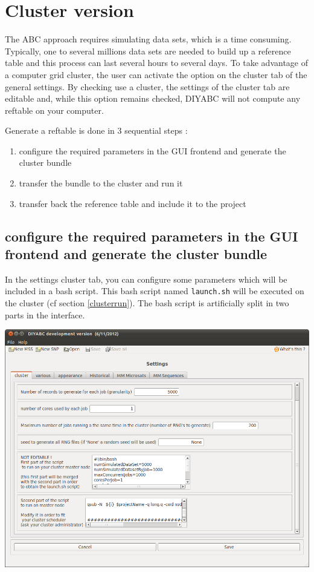 \clearpage
\section{Cluster version}\label{cluster}
The ABC approach requires simulating data sets, which is a time consuming. Typically, one to several millions data sets are needed to build up a reference table and this process can last several hours to several days. To take advantage of a computer grid cluster, the user can activate the option on the cluster tab of the general settings. By checking \textsf{use a cluster}, the settings of the cluster tab are editable and, while this option remains checked, DIYABC will not compute any reftable on your computer. 

Generate a reftable is done in 3 sequential steps :
\begin{enumerate}
 \item configure the required parameters in the GUI frontend and generate the cluster bundle
 \item transfer the bundle to the cluster and run it
 \item transfer back the reference table and include it to the project
\end{enumerate}

\subsection{configure the required parameters in the GUI frontend and generate the cluster bundle}\label{clusterconfigure}
In the settings cluster tab, you can configure some parameters which will be included in a bash script. This bash script named \texttt{launch.sh} will be executed on the cluster (cf section \ref{clusterrun}). The bash script is artificially split in two parts in the interface.

\includegraphics[scale=0.33]{gui_pictures/Capture-DIYABC-cluster.png} \\


